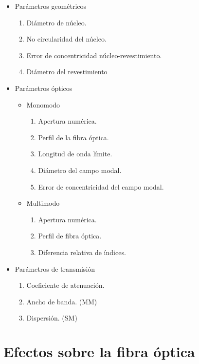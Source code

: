 \documentclass[
	12pt, %
	fleqn, %
	a4paper, %
	oneside, %
]{LegrandOrangeBook}
\begin{document}
\begin{itemize}
\item Parámetros geométricos
\begin{enumerate}
\item Diámetro de núcleo.
\item No circularidad del núcleo.
\item Error de concentricidad núcleo-revestimiento.
\item Diámetro del revestimiento
\end{enumerate}
\item Parámetros ópticos
\begin{itemize}
\item Monomodo
\begin{enumerate}
\item Apertura numérica.
\item Perfil de la fibra óptica.
\item Longitud de onda límite.
\item Diámetro del campo modal.
\item Error de concentricidad del campo modal.
\end{enumerate}
\item Multimodo
\begin{enumerate}
\item Apertura numérica.
\item Perfil de fibra óptica.
\item Diferencia relativa de índices.
\end{enumerate}
\end{itemize}
\item Parámetros de transmisión
\begin{enumerate}
\item Coeficiente de atenuación.
\item Ancho de banda. (MM)
\item Dispersión. (SM)
\end{enumerate}
\end{itemize}
\chapter{Efectos sobre la fibra óptica}
\end{document}
